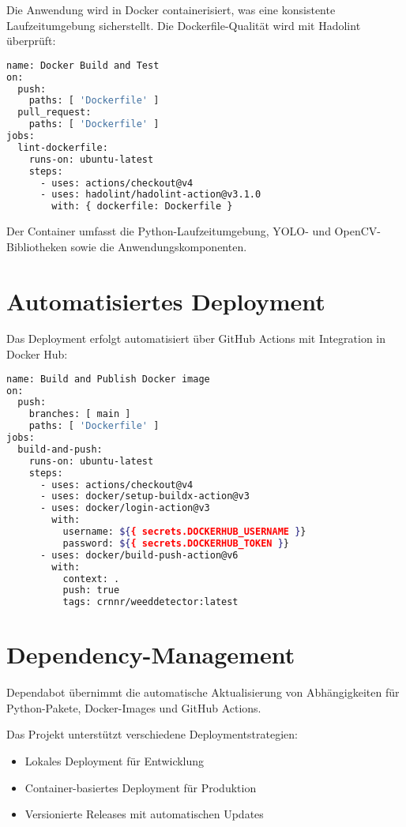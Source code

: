 \documentclass[12pt]{scrreprt}
\begin{document}
Die Anwendung wird in Docker containerisiert, was eine konsistente Laufzeitumgebung sicherstellt. Die Dockerfile-Qualität wird mit Hadolint überprüft:

\begin{lstlisting}[language= Bash, caption=Docker Lint]
name: Docker Build and Test
on:
  push:
    paths: [ 'Dockerfile' ]
  pull_request:
    paths: [ 'Dockerfile' ]
jobs:
  lint-dockerfile:
    runs-on: ubuntu-latest
    steps:
      - uses: actions/checkout@v4
      - uses: hadolint/hadolint-action@v3.1.0
        with: { dockerfile: Dockerfile }
\end{lstlisting}

Der Container umfasst die Python-Laufzeitumgebung, YOLO- und OpenCV-Bibliotheken sowie die Anwendungskomponenten.

\section{Automatisiertes Deployment}

Das Deployment erfolgt automatisiert über GitHub Actions mit Integration in Docker Hub:

\begin{lstlisting}[language= Bash, caption=Build and Publish]
name: Build and Publish Docker image
on:
  push:
    branches: [ main ]
    paths: [ 'Dockerfile' ]
jobs:
  build-and-push:
    runs-on: ubuntu-latest
    steps:
      - uses: actions/checkout@v4
      - uses: docker/setup-buildx-action@v3
      - uses: docker/login-action@v3
        with:
          username: ${{ secrets.DOCKERHUB_USERNAME }}
          password: ${{ secrets.DOCKERHUB_TOKEN }}
      - uses: docker/build-push-action@v6
        with:
          context: .
          push: true
          tags: crnnr/weeddetector:latest
\end{lstlisting}

\section{Dependency-Management}

Dependabot übernimmt die automatische Aktualisierung von Abhängigkeiten für Python-Pakete, Docker-Images und GitHub Actions.

Das Projekt unterstützt verschiedene Deploymentstrategien:
\begin{itemize}
    \item Lokales Deployment für Entwicklung
    \item Container-basiertes Deployment für Produktion
    \item Versionierte Releases mit automatischen Updates
\end{itemize}
\end{document}
